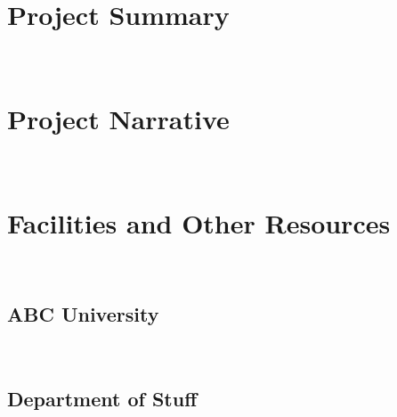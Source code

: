 \newpage

\section*{Project Summary}

~

\lipsum[1]

\newpage

\section*{Project Narrative}

~ 

\lipsum[2][1-3]

\newpage

\section*{Facilities and Other Resources}

~

\subsection*{ABC University}

\lipsum[8]

~

\subsection*{Department of Stuff}

\lipsum[8]

~

